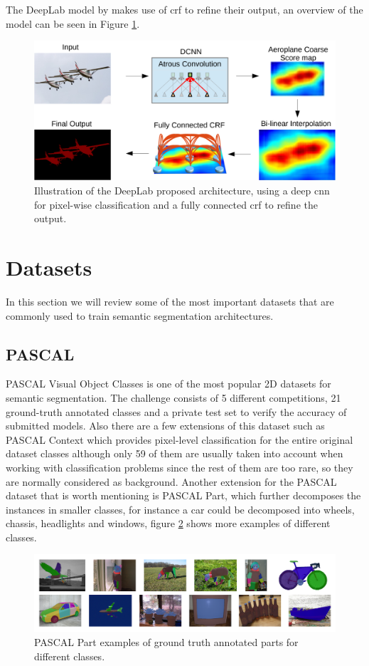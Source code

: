 The DeepLab model by \cite{DBLP:journals/corr/ChenPK0Y16} makes use of \gls{crf} to refine their output, an overview of the model can be seen in Figure \ref{fig:deeplab}. 

\begin{figure}
	\centering
	\includegraphics[width=0.7\linewidth]{archivos/deeplab}
	\caption{Illustration of the DeepLab proposed architecture, using a deep \gls{cnn} for pixel-wise classification and a fully connected \gls{crf} to refine the output.}
	\label{fig:deeplab}
\end{figure}

\section{Datasets}
\label{sec:datasets}
In this section we will review some of the most important datasets that are commonly used to train semantic segmentation architectures. 

\subsection{PASCAL}
PASCAL Visual Object Classes is one of the most popular 2D datasets for semantic segmentation. The challenge consists of 5 different competitions, 21 ground-truth annotated classes and a private test set to verify the accuracy of submitted models. Also there are a few extensions of this dataset such as PASCAL Context which provides pixel-level classification for the entire original dataset classes although only 59 of them are usually taken into account when working with classification problems since the rest of them are too rare, so they are normally considered as background. Another extension for the PASCAL dataset that is worth mentioning is PASCAL Part, which further decomposes the instances in smaller classes, for instance a car could be decomposed into wheels, chassis, headlights and windows, figure \ref{fig:pascal_part} shows more examples of different classes.

\begin{figure}[h]
	\includegraphics[scale=0.35]{archivos/pascal_part.png}
	\centering
	\caption{PASCAL Part examples of ground truth annotated parts for different classes.}
	\label{fig:pascal_part}
\end{figure}

